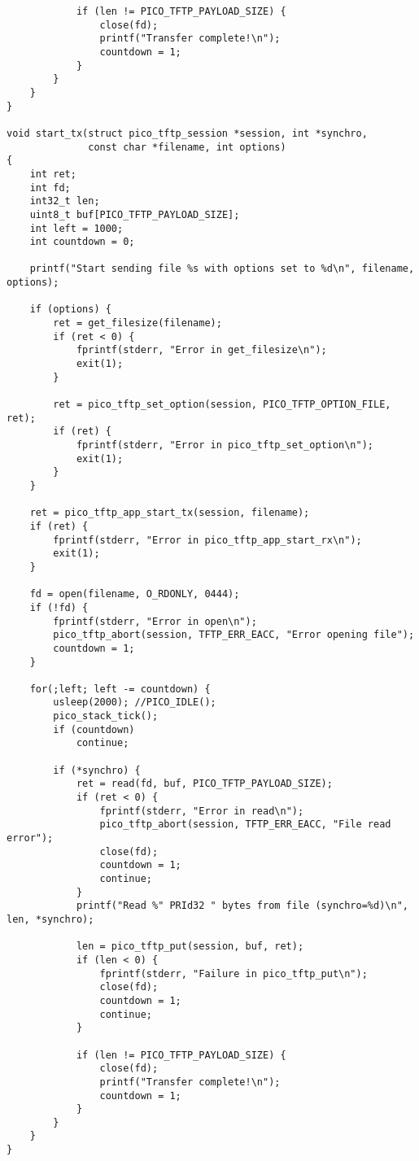 \begin{verbatim}
            if (len != PICO_TFTP_PAYLOAD_SIZE) {
                close(fd);
                printf("Transfer complete!\n");
                countdown = 1;
            }
        }
    }
}

void start_tx(struct pico_tftp_session *session, int *synchro,
              const char *filename, int options)
{
    int ret;
    int fd;
    int32_t len;
    uint8_t buf[PICO_TFTP_PAYLOAD_SIZE];
    int left = 1000;
    int countdown = 0;

    printf("Start sending file %s with options set to %d\n", filename, options);

    if (options) {
        ret = get_filesize(filename);
        if (ret < 0) {
            fprintf(stderr, "Error in get_filesize\n");
            exit(1);
        }

        ret = pico_tftp_set_option(session, PICO_TFTP_OPTION_FILE, ret);
        if (ret) {
            fprintf(stderr, "Error in pico_tftp_set_option\n");
            exit(1);
        }
    }

    ret = pico_tftp_app_start_tx(session, filename);
    if (ret) {
        fprintf(stderr, "Error in pico_tftp_app_start_rx\n");
        exit(1);
    }

    fd = open(filename, O_RDONLY, 0444);
    if (!fd) {
        fprintf(stderr, "Error in open\n");
        pico_tftp_abort(session, TFTP_ERR_EACC, "Error opening file");
        countdown = 1;
    }

    for(;left; left -= countdown) {
        usleep(2000); //PICO_IDLE();
        pico_stack_tick();
        if (countdown)
            continue;

        if (*synchro) {
            ret = read(fd, buf, PICO_TFTP_PAYLOAD_SIZE);
            if (ret < 0) {
                fprintf(stderr, "Error in read\n");
                pico_tftp_abort(session, TFTP_ERR_EACC, "File read error");
                close(fd);
                countdown = 1;
                continue;
            }
            printf("Read %" PRId32 " bytes from file (synchro=%d)\n", len, *synchro);

            len = pico_tftp_put(session, buf, ret);
            if (len < 0) {
                fprintf(stderr, "Failure in pico_tftp_put\n");
                close(fd);
                countdown = 1;
                continue;
            }

            if (len != PICO_TFTP_PAYLOAD_SIZE) {
                close(fd);
                printf("Transfer complete!\n");
                countdown = 1;
            }
        }
    }
}


\end{verbatim}
